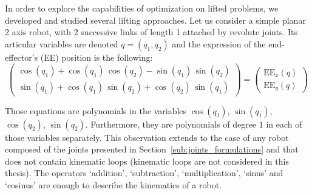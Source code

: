 In order to explore the capabilities of optimization on lifted problems, we developed and studied several lifting approaches.
Let us consider a simple planar 2 axis robot, with 2 successive links of length 1 attached by revolute joints.
Its articular variables are denoted $q = (q_1, q_2)$ and the expression of the end-effector's (EE) position is the following:
\begin{equation}
  \left(\begin{array}{c}
    \cos\!\left(q_{1}\right) + \cos\!\left(q_{1}\right)\, \cos\!\left(q_{2}\right) - \sin\!\left(q_{1}\right)\, \sin\!\left(q_{2}\right)\\
    \sin\!\left(q_{1}\right) + \cos\!\left(q_{1}\right)\, \sin\!\left(q_{2}\right) + \cos\!\left(q_{2}\right)\, \sin\!\left(q_{1}\right)
  \end{array}\right)
  =
  \left(\begin{array}{c}
    \text{EE}_{x}(q)\\
    \text{EE}_{y}(q)
  \end{array}\right)
\label{eq:direct_position}
\end{equation}

Those equations are polynomials in the variables $\cos(q_1)$, $\sin(q_1)$, $\cos(q_2)$, $\sin(q_2)$.
Furthermore, they are polynomials of degree $1$ in each of those variables separately.
This observation extends to the case of any robot composed of the joints presented in Section~\ref{sub:joints_formulations} and that does not contain kinematic loops (kinematic loops are not considered in this thesis).
The operators `addition', `subtraction', `multiplication', `sinus' and `cosinus' are enough to describe the kinematics of a robot.

